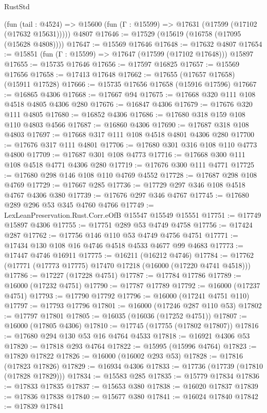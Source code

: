 \begin{lexlean}{RustStd}
\begin{coremodule}
    (fun (tail : @4524) => @15600 (fun (Γ : @15599) => @17631 (@17599 (@17102 (@17632 @15631)))))
    @4807
@17646 := @17529 (@15619 (@16758 (@17095 (@15628 @4808))))
@17647 := @15569 @17646
@17648 := @17632 @4807
@17654 := @15851 (fun (Γ : @15599) => @17647 (@17599 (@17102 @17648))) @15897
@17655 := @15735 @17646
@17656 := @17597 @16825
@17657 := @15569 @17656
@17658 := @17413 @17648
@17662 := @17655 (@17657 @17658) (@15911 @17528)
@17666 := @15735 @17656 @17658 (@15916 @17596)
@17667 := @16865 @4306
@17668 := @17667 @94
@17675 := @17668 @320 @111 @108 @4518 @4805 @4306 @280
@17676 := @16847 @4306
@17679 := @17676 @320 @111 @4805
@17680 := @16852 @4306
@17686 := @17680 @318 @159 @108 @110 @4803 @4566
@17687 := @16860 @4306
@17690 := @17687 @318 @108 @4803
@17697 := @17668 @317 @111 @108 @4518 @4801 @4306 @280
@17700 := @17676 @317 @111 @4801
@17706 := @17680 @301 @316 @108 @110 @4773 @4800
@17709 := @17687 @301 @108 @4773
@17716 := @17668 @300 @111 @108 @4518 @4771 @4306 @280
@17719 := @17676 @300 @111 @4771
@17725 := @17680 @298 @146 @108 @110 @4769 @4552
@17728 := @17687 @298 @108 @4769
@17729 := @17667 @285
@17736 := @17729 @297 @346 @108 @4518 @4767 @4306 @380
@17739 := @17676 @297 @346 @4767
@17745 := @17680 @289 @296 @53 @345 @4760 @4766
@17749 := LexLeanPreservation.Rust.Corr.eOfB @15547 @15549 @15551
@17751 := @17749 @15897 @4306
@17755 := @17751 @289 @53 @4749 @4758
@17756 := @17424 @287
@17762 := @17756 @146 @110 @53 @4749 @4756 @4751
@17771 := @17434 @130 @108 @16 @4746 @4518 @4533 @4677 @99 @4683
@17773 := @17447 @4746 @16911
@17775 := @16211 (@16212 @4746)
@17784 := @17762 (@17771 (@17773 @17775) @17470 @17218 (@16000 (@17220 @4741 @4518)))
@17786 := @17227 (@17228 @4751)
@17787 := @17784 @17786
@17789 := @16000 (@17232 @4751)
@17790 := @17787 @17789
@17792 := @16000 (@17237 @4751)
@17793 := @17790 @17792
@17796 := @16000 (@17241 @4751 @110)
@17797 := @17793 @17796
@17801 := @16000 (@17246 @287 @110 @53)
@17802 := @17797 @17801
@17805 := @16035 (@16036 (@17252 @4751))
@17807 := @16000 (@17805 @4306)
@17810 := @17745 (@17755 (@17802 @17807))
@17816 := @17680 @294 @130 @53 @16 @4764 @4533
@17818 := @16921 @4306 @53
@17820 := @17818 @293 @4764
@17822 := @15995 (@15996 @4764)
@17823 := @17820 @17822
@17826 := @16000 (@16002 @293 @53)
@17828 := @17816 (@17823 @17826)
@17829 := @16934 @4306
@17833 := @17736 (@17739 (@17810 (@17828 @17829)))
@17834 := @15583 @285
@17835 := @15779 @17834
@17836 := @17833 @17835
@17837 := @15653 @380
@17838 := @16020 @17837
@17839 := @17836 @17838
@17840 := @15677 @380
@17841 := @16024 @17840
@17842 := @17839 @17841

\end{coremodule}
\end{lexlean}
